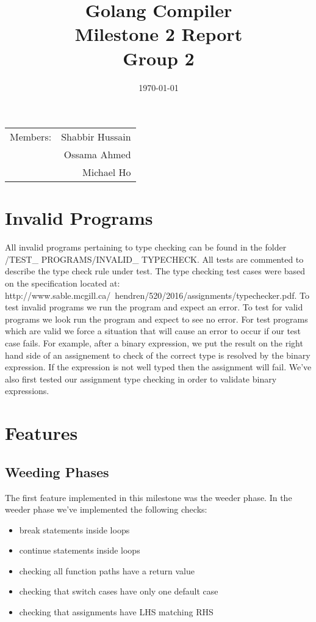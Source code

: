 \documentclass{article}
\title{Golang Compiler\\ Milestone 2 Report\\ Group 2} %
\date{\today} %
\begin{document}
\maketitle %

\begin{center}
\begin{tabular}{l r}
Members: & Shabbir Hussain \\ %
& Ossama Ahmed \\ %
& Michael Ho \\ \end{tabular}
\end{center}

\section{Invalid Programs}
All invalid programs pertaining to type checking can be found in the folder /TEST\_ PROGRAMS/INVALID\_ TYPECHECK. All tests are commented to describe the type check rule under test. The type checking test cases were based on the specification located at: http://www.sable.mcgill.ca/~hendren/520/2016/assignments/typechecker.pdf. To test invalid programs we run the program and expect an error. To test for valid programs we look run the program and expect to see no error. For test programs which are valid we force a situation that will cause an error to occur if our test case fails. For example, after a binary expression, we put the result on the right hand side of an assignement to check of the correct type is resolved by the binary expression. If the expression is not well typed then the assignment will fail. We've also first tested our assignment type checking in order to validate binary expressions.


\section{Features}

\subsection{Weeding Phases}
The first feature implemented in this milestone was the weeder phase. In the weeder phase we've implemented the following checks:
\begin{itemize}
\item break statements inside loops
\item continue statements inside loops
\item checking all function paths have a return value
\item checking that switch cases have only one default case
\item checking that assignments have LHS matching RHS
\end{itemize}
\end{document}
